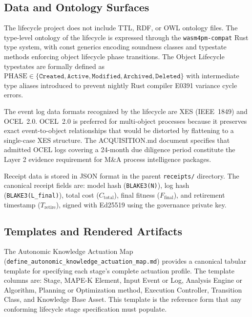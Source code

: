 \subsection{Data and Ontology Surfaces}
\label{sec:lifecycle-implementation-data}

The lifecycle project does not include TTL, RDF, or OWL ontology files. The type-level
ontology of the lifecycle is expressed through the \texttt{wasm4pm-compat} Rust type
system, with const generics encoding soundness classes and typestate methods enforcing
object lifecycle phase transitions. The Object Lifecycle typestates are formally defined
as $\mathrm{PHASE} \in \{\texttt{Created}, \texttt{Active}, \texttt{Modified},
\texttt{Archived}, \texttt{Deleted}\}$ with intermediate type aliases introduced to
prevent nightly Rust compiler E0391 variance cycle errors.

The event log data formats recognized by the lifecycle are XES (IEEE~1849) and OCEL~2.0.
OCEL~2.0 is preferred for multi-object processes because it preserves exact
event-to-object relationships that would be distorted by flattening to a single-case
XES structure. The ACQUISITION.md document specifies that admitted OCEL logs covering
a 24-month due diligence period constitute the Layer 2 evidence requirement for
M\&A process intelligence packages.

Receipt data is stored in JSON format in the parent \texttt{receipts/} directory. The
canonical receipt fields are: model hash (\texttt{BLAKE3(N)}), log hash
(\texttt{BLAKE3(L\_final)}), total cost ($C_{\mathrm{total}}$), final fitness
($F_{\mathrm{final}}$), and retirement timestamp ($T_{\mathrm{retire}}$), signed with
Ed25519 using the governance private key.

\subsection{Templates and Rendered Artifacts}
\label{sec:lifecycle-implementation-templates}

The Autonomic Knowledge Actuation Map (\texttt{define\_autonomic\_knowledge\_actuation\_map.md})
provides a canonical tabular template for specifying each stage's complete actuation
profile. The template columns are: Stage, MAPE-K Element, Input Event or Log, Analysis
Engine or Algorithm, Planning or Optimization method, Execution Controller, Transition
Class, and Knowledge Base Asset. This template is the reference form that any conforming
lifecycle stage specification must populate.

